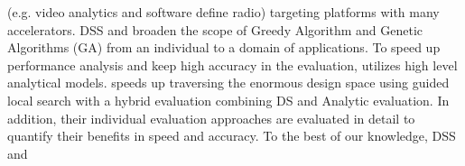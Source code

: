  (e.g. video analytics and software define radio) targeting platforms with many accelerators. DSS and \ga broaden the scope of Greedy Algorithm and Genetic Algorithms (GA) from an individual to a domain of applications.
 To speed up performance analysis and keep high accuracy in the evaluation, \ga utilizes high level analytical models. \ga speeds up traversing the enormous design space using guided local search with a hybrid evaluation combining DS and  Analytic evaluation. In addition, their individual evaluation approaches are evaluated in detail to quantify their benefits in speed and accuracy. To the best of our knowledge, DSS and \ga {}


